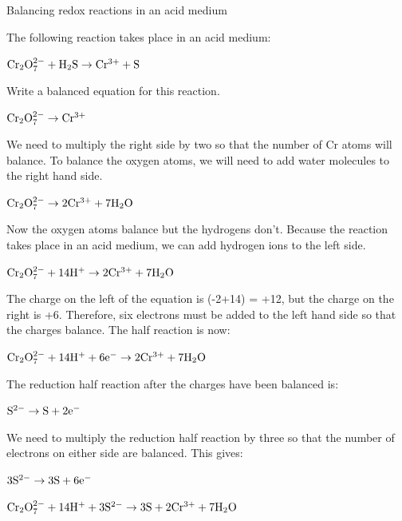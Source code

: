 \begin{wex}{Balancing redox reactions in an acid medium}{The following reaction takes place in an acid medium:
\begin{center}
$\rm{Cr_{2}O_{7}^{2-} + H_{2}S \rightarrow Cr^{3+} + S}$
\end{center}
Write a balanced equation for this reaction.}{
\begin{center}
$\rm{Cr_{2}O_{7}^{2-} \rightarrow Cr^{3+}}$
\end{center}
We need to multiply the right side by two so that the number of Cr atoms will balance. To balance the oxygen atoms, we will need to add water molecules to the right hand side. 
\begin{center}
$\rm{Cr_{2}O_{7}^{2-} \rightarrow 2Cr^{3+} + 7H_{2}O}$
\end{center}
Now the oxygen atoms balance but the hydrogens don't. Because the reaction takes place in an acid medium, we can add hydrogen ions to the left side.
\begin{center}
$\rm{Cr_{2}O_{7}^{2-} + 14H^{+} \rightarrow 2Cr^{3+} + 7H_{2}O}$
\end{center}
The charge on the left of the equation is (-2+14) = +12, but the charge on the right is +6. Therefore, six electrons must be added to the left hand side so that the charges balance. The half reaction is now:
\begin{center}
$\rm{Cr_{2}O_{7}^{2-} + 14H^{+} + 6e^{-} \rightarrow 2Cr^{3+} + 7H_{2}O}$
\end{center}
The reduction half reaction after the charges have been balanced is:
\begin{center}
$\rm{S^{2-} \rightarrow S + 2e^{-}}$
\end{center}
We need to multiply the reduction half reaction by three so that the number of electrons on either side are balanced. This gives:
\begin{center}
$\rm{3S^{2-} \rightarrow 3S + 6e^{-}}$
\end{center}
\begin{center}
$\rm{Cr_{2}O_{7}^{2-} + 14H^{+} + 3S^{2-} \rightarrow 3S + 2Cr^{3+} + 7H_{2}O}$
\end{center}
}
\end{wex}

